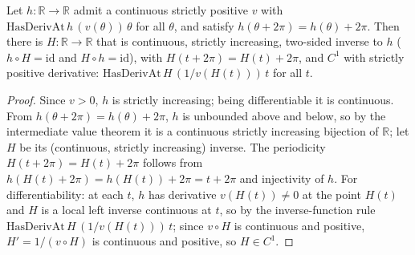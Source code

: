 \begin{lemma}
  \label{lem:exists_c1_circle_inverse}
  Let $h:\mathbb{R}\to\mathbb{R}$ admit a continuous strictly positive $v$ with
  $\mathrm{HasDerivAt}\,h\,(v(\theta))\,\theta$ for all $\theta$, and satisfy
  $h(\theta+2\pi)=h(\theta)+2\pi$. Then there is $H:\mathbb{R}\to\mathbb{R}$ that is
  continuous, strictly increasing, two-sided inverse to $h$ ($h\circ H=\mathrm{id}$
  and $H\circ h=\mathrm{id}$), with $H(t+2\pi)=H(t)+2\pi$, and $C^1$ with strictly
  positive derivative: $\mathrm{HasDerivAt}\,H\,(1/v(H(t)))\,t$ for all $t$.
\end{lemma}
\begin{proof}

\leanok
  Since $v>0$, $h$ is strictly increasing; being differentiable it is continuous.
  From $h(\theta+2\pi)=h(\theta)+2\pi$, $h$ is unbounded above and below, so by the
  intermediate value theorem it is a continuous strictly increasing bijection of
  $\mathbb{R}$; let $H$ be its (continuous, strictly increasing) inverse. The
  periodicity $H(t+2\pi)=H(t)+2\pi$ follows from $h(H(t)+2\pi)=h(H(t))+2\pi=t+2\pi$
  and injectivity of $h$. For differentiability: at each $t$, $h$ has derivative
  $v(H(t))\ne0$ at the point $H(t)$ and $H$ is a local left inverse continuous at
  $t$, so by the inverse-function rule $\mathrm{HasDerivAt}\,H\,(1/v(H(t)))\,t$;
  since $v\circ H$ is continuous and positive, $H'=1/(v\circ H)$ is continuous and
  positive, so $H\in C^1$.
\end{proof}
